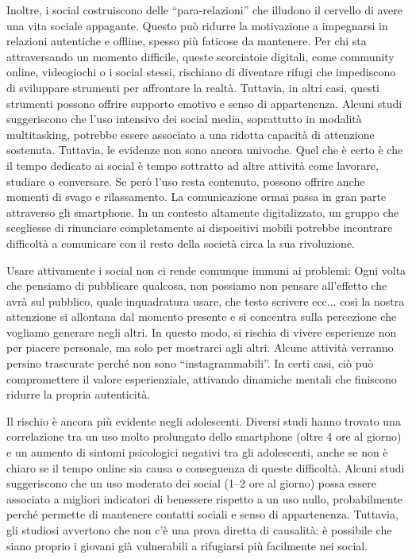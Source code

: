 \documentclass[12pt]{book} %
\begin{document}
\begin{mdframed}[linewidth=1pt]
Inoltre, i social costruiscono delle “para-relazioni” che illudono il cervello di avere una vita sociale appagante. Questo può ridurre la motivazione a impegnarsi in relazioni autentiche e offline, spesso più faticose da mantenere. Per chi sta attraversando un momento difficile, queste scorciatoie digitali, come community online, videogiochi o i social stessi, rischiano di diventare rifugi che impediscono di sviluppare strumenti per affrontare la realtà. Tuttavia, in altri casi, questi strumenti possono offrire supporto emotivo e senso di appartenenza. Alcuni studi suggeriscono che l’uso intensivo dei social media, soprattutto in modalità multitasking, potrebbe essere associato a una ridotta capacità di attenzione sostenuta. Tuttavia, le evidenze non sono ancora univoche. Quel che è certo è che il tempo dedicato ai social è tempo sottratto ad altre attività come lavorare, studiare o conversare. Se però l’uso resta contenuto, possono offrire anche momenti di svago e rilassamento.
La comunicazione ormai passa in gran parte attraverso gli smartphone. In un contesto altamente digitalizzato, un gruppo che scegliesse di rinunciare completamente ai dispositivi mobili potrebbe incontrare difficoltà a comunicare con il resto della società circa la sua rivoluzione.

Usare attivamente i social non ci rende comunque immuni ai problemi: Ogni volta che pensiamo di pubblicare qualcosa, non possiamo non pensare all'effetto che avrà sul pubblico, quale inquadratura usare, che testo scrivere ecc... così la nostra attenzione si allontana dal momento presente e si concentra sulla percezione che vogliamo generare negli altri. In questo modo, si rischia di vivere esperienze non per piacere personale, ma solo per mostrarci agli altri. Alcune attività verranno persino trascurate perché non sono “instagrammabili”. In certi casi, ciò può compromettere il valore esperienziale, attivando dinamiche mentali che finiscono ridurre la propria autenticità.

Il rischio è ancora più evidente negli adolescenti. Diversi studi hanno trovato una correlazione tra un uso molto prolungato dello smartphone (oltre 4 ore al giorno) e un aumento di sintomi psicologici negativi tra gli adolescenti, anche se non è chiaro se il tempo online sia causa o conseguenza di queste difficoltà. Alcuni studi suggeriscono che un uso moderato dei social (1–2 ore al giorno) possa essere associato a migliori indicatori di benessere rispetto a un uso nullo, probabilmente perché permette di mantenere contatti sociali e senso di appartenenza. Tuttavia, gli studiosi avvertono che non c’è una prova diretta di causalità: è possibile che siano proprio i giovani già vulnerabili a rifugiarsi più facilmente nei social.


\end{mdframed}
\end{document}

